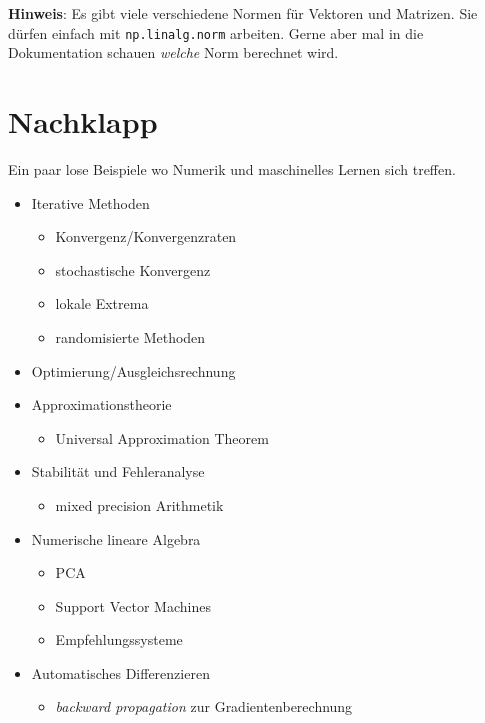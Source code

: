 \documentclass[
]{book}
\providecommand{\tightlist}{%
  \setlength{\itemsep}{0pt}\setlength{\parskip}{0pt}}
\theoremstyle{definition}
\theoremstyle{definition}
\theoremstyle{definition}
\theoremstyle{definition}
\theoremstyle{remark}
\begin{document}
\textbf{Hinweis}: Es gibt viele verschiedene Normen für Vektoren und Matrizen. Sie dürfen einfach mit \texttt{np.linalg.norm} arbeiten. Gerne aber mal in die Dokumentation schauen \emph{welche} Norm berechnet wird.

\hypertarget{nachklapp}{%
\chapter{Nachklapp}\label{nachklapp}}

Ein paar lose Beispiele wo Numerik und maschinelles Lernen sich treffen.

\begin{itemize}
\item
  Iterative Methoden

  \begin{itemize}
  \tightlist
  \item
    Konvergenz/Konvergenzraten
  \item
    stochastische Konvergenz
  \item
    lokale Extrema
  \item
    randomisierte Methoden
  \end{itemize}
\item
  Optimierung/Ausgleichsrechnung
\item
  Approximationstheorie

  \begin{itemize}
  \tightlist
  \item
    Universal Approximation Theorem
  \end{itemize}
\item
  Stabilität und Fehleranalyse

  \begin{itemize}
  \tightlist
  \item
    mixed precision Arithmetik
  \end{itemize}
\item
  Numerische lineare Algebra

  \begin{itemize}
  \tightlist
  \item
    PCA
  \item
    Support Vector Machines
  \item
    Empfehlungssysteme
  \end{itemize}
\item
  Automatisches Differenzieren

  \begin{itemize}
  \tightlist
  \item
    \emph{backward propagation} zur Gradientenberechnung
  \end{itemize}
\end{itemize}
\end{document}
